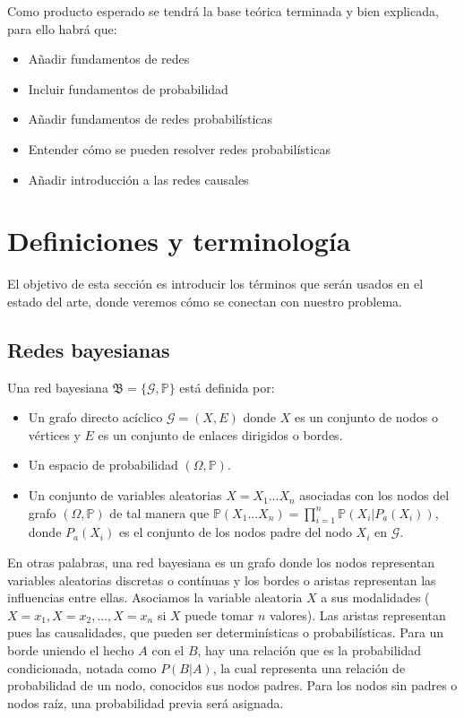 Como producto esperado se tendrá la base teórica terminada y bien explicada, para ello habrá que: 

\begin{itemize}
    \item Añadir fundamentos de redes
    \item Incluir fundamentos de probabilidad 
    \item Añadir fundamentos de redes probabilísticas 
    \item Entender cómo se pueden resolver redes probabilísticas 
    \item Añadir introducción a las redes causales 
\end{itemize}

\section{Definiciones y terminología}
El objetivo de esta sección es introducir los términos que serán usados en el estado del arte, donde veremos 
cómo se conectan con nuestro problema.

\subsection{Redes bayesianas}
\begin{definicion}\label{def:BN}
Una red bayesiana\cite{def-bncn} $\mathfrak{B} = \lbrace \mathcal{G}, \mathbb{P} \rbrace$ está definida por:
\begin{itemize}
    \item Un grafo directo acíclico $\mathcal{G}=(X,E)$ donde $X$ es un conjunto de nodos o vértices y $E$ 
    es un conjunto de enlaces dirigidos o bordes.
    \item Un espacio de probabilidad $(\Omega, \mathbb{P})$.
    \item Un conjunto de variables aleatorias $X={X_1...X_n}$ asociadas con los nodos del grafo $(\Omega, \mathbb{P})$ 
    de tal manera que $\mathbb{P}(X_1...X_n)= \prod_{i=1}^{n}\mathbb{P}(X_i|P_a(X_i))$, donde $P_a(X_i)$ es el 
    conjunto de los nodos padre del nodo $X_i$ en $\mathcal{G}$.  
\end{itemize}
\end{definicion}

En otras palabras, una red bayesiana es un grafo donde los nodos representan variables aleatorias discretas o contínuas 
y los bordes o aristas representan las influencias entre ellas. Asociamos la variable aleatoria $X$ a sus modalidades 
($X=x_1, X=x_2,..., X=x_n$ si $X$ puede tomar $n$ valores). Las aristas representan pues las causalidades, que pueden ser determinísticas 
o probabilísticas. Para un borde uniendo el hecho $A$ con el $B$, hay una relación que es la probabilidad condicionada, notada como $P(B|A)$, 
la cual representa una relación de probabilidad de un nodo, conocidos sus nodos padres. Para los nodos sin padres o nodos raíz, una probabilidad 
previa será asignada.

